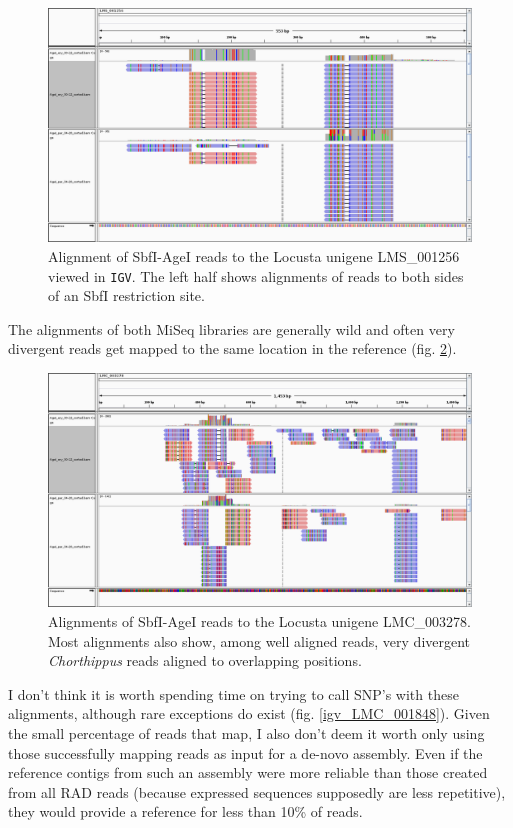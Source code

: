 \documentclass{article}\usepackage[]{graphicx}\usepackage[]{color}
\begin{document}
\begin{figure}
\centering
\includegraphics[width=\textwidth]{./figure/igv_LMS_001256}
\caption{Alignment of SbfI-AgeI reads to the Locusta unigene LMS\_001256 viewed in \texttt{IGV}. The left half shows alignments of reads to both sides of an SbfI restriction site.}
\label{both_sides_fig}
\end{figure}

The alignments of both MiSeq libraries are generally wild and often very divergent reads get mapped to the same location in the reference (fig. \ref{igv_LMC_003278}). 

\begin{figure}
\centering
\includegraphics[width=\textwidth]{./figure/igv_LMC_003278}
\caption{Alignments of SbfI-AgeI reads to the Locusta unigene LMC\_003278. Most alignments also show, among well aligned reads, very divergent \textit{Chorthippus} reads aligned to overlapping positions.}
\label{igv_LMC_003278}
\end{figure}

I don't think it is worth spending time on trying to call SNP's with these alignments, although rare exceptions do exist (fig. \ref{igv_LMC_001848}). Given the small percentage of reads that map, I also don't deem it worth only using those successfully mapping reads as input for a de-novo assembly. Even if the reference contigs from such an assembly were more reliable than those created from all RAD reads (because expressed sequences supposedly are less repetitive), they would provide a reference for less than 10\% of reads. 
\end{document}
